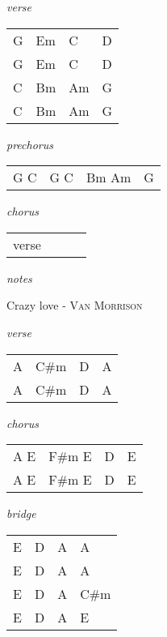 \documentclass[12pt]{article}
\begin{document}
\huge
\textit{verse}

\begin{tabular}{|P{1.25in}|P{1.25in}|P{1.25in}|P{1.25in}|}
  G  & Em  & C  &  D \\
  G  & Em  & C  &  D \\
  C  & Bm  & Am  &  G \\
  C  & Bm  & Am  &  G \\
\end{tabular}

\textit{prechorus}

\begin{tabular}{|P{1.25in}|P{1.25in}|P{1.25in}|P{1.25in}|}
  G C  &  G C & Bm Am  &  G \\
\end{tabular}

\textit{chorus}

\begin{tabular}{|P{1.25in}|P{1.25in}|P{1.25in}|P{1.25in}|}
  verse
\end{tabular}


\textit{notes}

\newpage


{\Huge Crazy love} {\huge - \textsc{Van Morrison}}

\huge
\textit{verse}

\begin{tabular}{|P{1.25in}|P{1.25in}|P{1.25in}|P{1.25in}|}
  A  & C#m  &  D &  A \\
  A  & C#m  & D & A   \\
\end{tabular}

\textit{chorus}

\begin{tabular}{|P{1.25in}|P{1.25in}|P{1.25in}|P{1.25in}|}
  A  E  &  F#m  E&  D & E  \\
  A  E  &  F#m  E&  D & E  \\
\end{tabular}

\textit{bridge}

\begin{tabular}{|P{1.25in}|P{1.25in}|P{1.25in}|P{1.25in}|}
  E  &  D & A  &  A \\
  E  &  D & A  &  A \\
  E  &  D & A  &  C#m \\
  E  &  D & A  &  E \\
\end{tabular}
\end{document}
